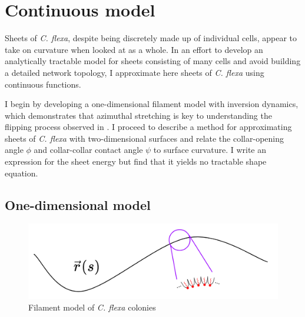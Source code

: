 
\chapter{Continuous model} \label{ch:2}

\ifpdf
    \graphicspath{{Chapter2/Figs/Raster/}{Chapter2/Figs/PDF/}{Chapter2/Figs/}}
\else
    \graphicspath{{Chapter2/Figs/Vector/}{Chapter2/Figs/}}
\fi

Sheets of \textit{C. flexa}, despite being discretely made up of individual cells, appear to take on curvature when looked at as a whole. 
In an effort to develop an analytically tractable model for sheets consisting of many cells and avoid building a detailed network topology, I approximate here sheets of \textit{C. flexa} using continuous functions.

I begin by developing a one-dimensional filament model with inversion dynamics, which demonstrates that azimuthal stretching is key to understanding the flipping process observed in \citet{brunet2019}. 
I proceed to describe a method for approximating sheets of \textit{C. flexa} with two-dimensional surfaces and relate the collar-opening angle $\phi$ and collar-collar contact angle $\psi$ to surface curvature. 
I write an expression for the sheet energy but find that it yields no tractable shape equation.

\section{One-dimensional model} \label{sec:c_1d}

\begin{figure}[htbp]
	\centering
	\includegraphics[width=\textwidth]{chain.png}
	\caption{Filament model of \textit{C. flexa} colonies}
	\label{fig:chain}
\end{figure}

